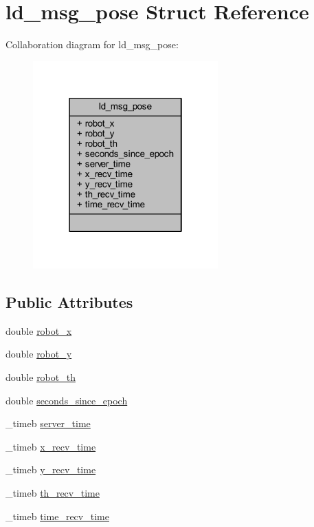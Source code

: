 \hypertarget{structld__msg__pose}{}\section{ld\+\_\+msg\+\_\+pose Struct Reference}
\label{structld__msg__pose}


Collaboration diagram for ld\+\_\+msg\+\_\+pose\+:\nopagebreak
\begin{figure}[H]
\begin{center}
\leavevmode
\includegraphics[width=202pt]{structld__msg__pose__coll__graph}
\end{center}
\end{figure}
\subsection*{Public Attributes}
\begin{DoxyCompactItemize}
\item 
double \mbox{\hyperlink{structld__msg__pose_a30c84490978ccf4a9092a15346d5cac0}{robot\+\_\+x}}
\item 
double \mbox{\hyperlink{structld__msg__pose_ad0b8cca5ea09c38753c6b37197de67c4}{robot\+\_\+y}}
\item 
double \mbox{\hyperlink{structld__msg__pose_a0bc12453bebcdb0a0052149bfe585367}{robot\+\_\+th}}
\item 
double \mbox{\hyperlink{structld__msg__pose_ad26937c8008680739f207cbc0d76c003}{seconds\+\_\+since\+\_\+epoch}}
\item 
\+\_\+timeb \mbox{\hyperlink{structld__msg__pose_a812b4a4a731bc33b0a356b1340610e28}{server\+\_\+time}}
\item 
\+\_\+timeb \mbox{\hyperlink{structld__msg__pose_a4a4636747213a18e34dc05b5ea964dfd}{x\+\_\+recv\+\_\+time}}
\item 
\+\_\+timeb \mbox{\hyperlink{structld__msg__pose_a1ab8f32a7a2edd172e33057719dbe9e9}{y\+\_\+recv\+\_\+time}}
\item 
\+\_\+timeb \mbox{\hyperlink{structld__msg__pose_acf025c0af4d2a3195c42d9ca133d3e74}{th\+\_\+recv\+\_\+time}}
\item 
\+\_\+timeb \mbox{\hyperlink{structld__msg__pose_a68a03febea822176935f8e14f1897b54}{time\+\_\+recv\+\_\+time}}
\end{DoxyCompactItemize}



